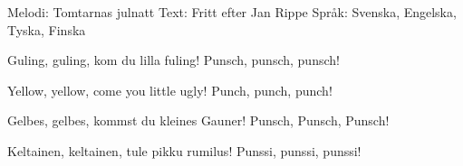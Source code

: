 \begin{song}

\begin{songmeta}
Melodi: Tomtarnas julnatt
Text: Fritt efter Jan Rippe
Språk: Svenska, Engelska, Tyska, Finska
\end{songmeta}

\begin{songtext}
Guling, guling, kom du lilla fuling! Punsch, punsch, punsch!

Yellow, yellow, come you little ugly!
Punch, punch, punch!

Gelbes, gelbes, kommst du kleines Gauner!
Punsch, Punsch, Punsch!

Keltainen, keltainen, tule pikku rumilus!
Punssi, punssi, punssi!
\end{songtext}
\end{song}
